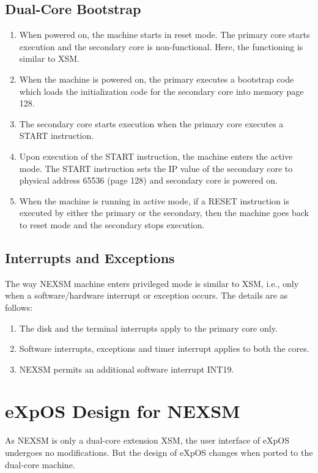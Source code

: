 \documentclass[12pt]{report}
\begin{document}
\subsection{Dual-Core Bootstrap}
\begin{enumerate}
    \item When powered on, the machine starts in reset mode. The primary core starts execution and the secondary core is non-functional. Here, the functioning is similar to XSM.
    \item When the machine is powered on, the primary executes a bootstrap code which loads the initialization code for the secondary core into memory page 128.
    \item The secondary core starts execution when the primary core executes a START instruction.
    \item Upon execution of the START instruction, the machine enters the active mode. The START instruction sets the IP value of the secondary core to physical address 65536 (page 128) and secondary core is powered on.
    \item When the machine is running in active mode, if a RESET instruction is executed by either the primary or the secondary, then the machine goes back to reset mode and the secondary stops execution.
\end{enumerate}

\subsection{Interrupts and Exceptions}
The way NEXSM machine enters privileged mode is similar to XSM, i.e., only when a software/hardware interrupt or exception occurs. The details are as follows:
\begin{enumerate}
    \item The disk and the terminal interrupts apply to the primary core only.
    \item Software interrupts, exceptions and timer interrupt applies to both the cores.
    \item NEXSM permits an additional software interrupt INT19.
\end{enumerate}


\section{eXpOS Design for NEXSM}
As NEXSM is only a dual-core extension XSM, the user interface of eXpOS undergoes no modifications. But the design of eXpOS changes when ported to the dual-core machine.
\end{document}

